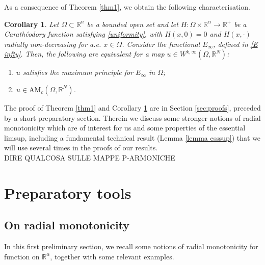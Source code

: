 \documentclass[a4paper,11pt]{article}
\numberwithin{equation}{section}
\newtheorem{Corollary}[Theorem]{Corollary}
\newcommand{\numberset}{\mathbb}
\newcommand{\Om}{\Omega}
\newcommand{\R}{\numberset{R}}
\theoremstyle{definition}
\begin{document}
As a consequence of Theorem \ref{thm1}, we obtain the following characterisation.
\begin{Corollary}\label{thm2}
Let $\Om\subset\R^n$ be a bounded open set and let $H:\Om\times\R^\alpha\to\R^+$ be a Carathéodory function satisfying \eqref{uniformity}, with $H(x,0)=0$ and $H(x, \cdot)$ radially non-decreasing for a.e. $x\in\Om$. Consider the functional $E_\infty$, defined in \eqref{E infty}.
Then, the following are equivalent for a map $u\in W^{k,\infty}(\Om,\R^N)$:
\begin{enumerate}
\item[i)] $u$ satisfies the maximum principle for $E_\infty$ in $\Om$;
\item[ii)] $u\in \mathrm {AM}_c(\Om,\R^N)$.
\end{enumerate}
\end{Corollary}
The proof of Theorem \ref{thm1} and Corollary \ref{thm2} are in Section \ref{sec:proofs}, preceded by a short preparatory section. Therein we discuss some stronger notions of radial monotonicity which are of interest for us and some properties of the essential limsup, including a fundamental technical result (Lemma \ref{lemma esssup}) that we will use several times in the proofs of our results.\\
DIRE QUALCOSA SULLE MAPPE P-ARMONICHE

\section{Preparatory tools}\label{prep}
\subsection{On radial monotonicity}\label{radial mon}
In this first preliminary section, we recall some notions of radial monotonicity for function on $\R^\alpha$, together with some relevant examples.
\end{document}
